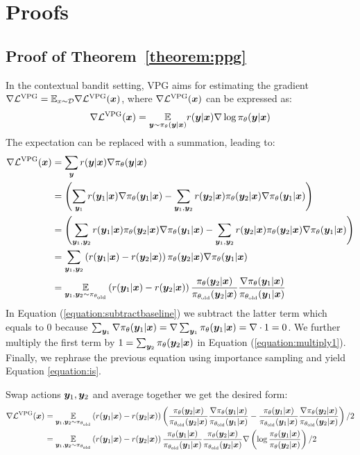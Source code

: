 \documentclass{article} %
\begin{document}
\section{Proofs}
\subsection{Proof of Theorem~\ref{theorem:ppg}} 
In the contextual bandit setting, VPG aims for estimating the gradient $\nabla\mathcal{L}^{\text{VPG}} = \mathbb{E}_{x\sim\mathcal{D}}\nabla\mathcal{L}^{\text{VPG}}({\bm{x}})$, where $\nabla\mathcal{L}^{\text{VPG}}({\bm{x}})$ can be expressed as:
$$\nabla\mathcal{L}^{\text{VPG}}({\bm{x}}) = \underset{{\bm{y}}\sim\pi_{\theta}({\bm{y}}|{\bm{x}})}{\mathbb{E}}r({\bm{y}}|{\bm{x}})\nabla\log\pi_\theta({\bm{y}}|{\bm{x}})$$
The expectation can be replaced with a summation, leading to:
\begin{align}
\nabla \mathcal{L}^{\text{VPG}}({\bm{x}}) &= \sum_{{\bm{y}}} r({\bm{y}}|{\bm{x}})\nabla\pi_\theta({\bm{y}}|{\bm{x}})\\
&= \left(\sum_{{\bm{y}}_1}r({\bm{y}}_1|{\bm{x}})\nabla \pi_\theta({\bm{y}}_1|{\bm{x}}) - \sum_{{\bm{y}}_1,{\bm{y}}_2}r({\bm{y}}_2|{\bm{x}})\pi_\theta({\bm{y}}_2|{\bm{x}})\nabla \pi_\theta({\bm{y}}_1|{\bm{x}})\right)\label{equation:subtractbaseline}\\
&=\left(\sum_{{\bm{y}}_1,{\bm{y}}_2}r({\bm{y}}_1|{\bm{x}})\pi_\theta({\bm{y}}_2|{\bm{x}})\nabla \pi_\theta({\bm{y}}_1|{\bm{x}}) - \sum_{{\bm{y}}_1,{\bm{y}}_2}r({\bm{y}}_2|{\bm{x}})\pi_\theta({\bm{y}}_2|{\bm{x}})\nabla \pi_\theta({\bm{y}}_1|{\bm{x}})\right)\label{equation:multiply1}\\
&=\sum_{{\bm{y}}_1,{\bm{y}}_2}\left(r({\bm{y}}_1|{\bm{x}})-r({\bm{y}}_2|{\bm{x}})\right)\pi_\theta({\bm{y}}_2|{\bm{x}})\nabla\pi_\theta({\bm{y}}_1|{\bm{x}})\\
&=\underset{{\bm{y}}_1,{\bm{y}}_2\sim\pi_{\theta_{\text{old}}}}{\mathbb{E}}\left(r({\bm{y}}_1|{\bm{x}})-r({\bm{y}}_2|{\bm{x}})\right)\frac{\pi_\theta({\bm{y}}_2|{\bm{x}})}{\pi_{\theta_{\text{old}}}({\bm{y}}_2|{\bm{x}})}\frac{\nabla\pi_\theta({\bm{y}}_1|{\bm{x}})}{\pi_{\theta_{\text{old}}}({\bm{y}}_1|{\bm{x}})}\label{equation:is}
\end{align}
In Equation (\ref{equation:subtractbaseline}) we subtract the latter term which equals to $0$ because $\sum_{{\bm{y}}_1}\nabla\pi_{\theta}({\bm{y}}_1|{\bm{x}}) = \nabla\sum_{{\bm{y}}_1}\pi_{\theta}({\bm{y}}_1|{\bm{x}}) = \nabla\cdot 1 = 0$. We further multiply the first term by $1 = \sum_{{\bm{y}}_2}\pi_{\theta}({\bm{y}}_2|{\bm{x}})$ in Equation (\ref{equation:multiply1}). Finally, we rephrase the previous equation using importance sampling and yield Equation \ref{equation:is}.

Swap actions ${\bm{y}}_1, {\bm{y}}_2$ and average together we get the desired form:
\begin{align*}
\nabla \mathcal{L}^{\text{VPG}}({\bm{x}})&=\underset{
{\bm{y}}_1,{\bm{y}}_2\sim\pi_{\theta_{\text{old}}}
}{\mathbb{E}}\left(r({\bm{y}}_1|{\bm{x}})-r({\bm{y}}_2|{\bm{x}})\right)\left(\frac{\pi_\theta({\bm{y}}_2|{\bm{x}})}{\pi_{\theta_{\text{old}}}({\bm{y}}_2|{\bm{x}})}\frac{\nabla\pi_\theta({\bm{y}}_1|{\bm{x}})}{\pi_{\theta_{\text{old}}}({\bm{y}}_1|{\bm{x}})}-\frac{\pi_\theta({\bm{y}}_1|{\bm{x}})}{\pi_{\theta_{\text{old}}}({\bm{y}}_1|{\bm{x}})}\frac{\nabla\pi_\theta({\bm{y}}_2|{\bm{x}})}{\pi_{\theta_{\text{old}}}({\bm{y}}_2|{\bm{x}})}\right)/2\\
&=\underset{{\bm{y}}_1,{\bm{y}}_2\sim\pi_{\theta_{\text{old}}}}{\mathbb{E}}\left(r({\bm{y}}_1|{\bm{x}})-r({\bm{y}}_2|{\bm{x}})\right)\frac{\pi_\theta({\bm{y}}_1|{\bm{x}})}{\pi_{\theta_{\text{old}}}({\bm{y}}_1|{\bm{x}})}\frac{\pi_\theta({\bm{y}}_2|{\bm{x}})}{\pi_{\theta_{\text{old}}}({\bm{y}}_2|{\bm{x}})}\nabla\left(\log\frac{\pi_\theta({\bm{y}}_1|{\bm{x}})}{\pi_\theta({\bm{y}}_2|{\bm{x}})}\right)/2
\end{align*}
\end{document}
